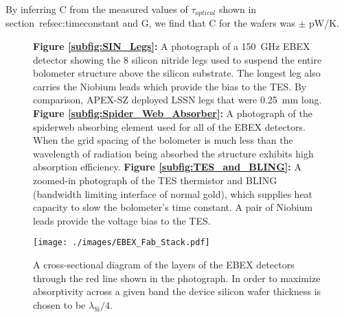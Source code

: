 \documentclass[../EBEXPaper2.tex]{subfiles}
\begin{document}
By inferring C from the measured values of $\tau_{optical}$ shown in section~ref{sec:timeconstant} and G, we find that C for the wafers was   $\pm$  pW/K. 


\begin{figure}[ht!]
\centering
{}
\caption{\textbf{Figure \ref{subfig:SIN_Legs}: } A photograph of a 150~GHz \ac{EBEX} detector showing the 8 silicon nitride legs used to suspend the entire bolometer structure above the silicon substrate.  The longest leg also carries the Niobium leads which provide the bias to the \ac{TES}.  By comparison, APEX-SZ deployed LSSN legs that were 0.25~mm long. \textbf{Figure \ref{subfig:Spider_Web_Absorber}: }  A photograph of the spiderweb absorbing element used for all of the \ac{EBEX} detectors.  When the grid spacing of the bolometer is much less than the wavelength of radiation being absorbed the structure exhibits high absorption efficiency. \textbf{Figure \ref{subfig:TES_and_BLING}: } A zoomed-in photograph of the \ac{TES} thermistor and BLING (bandwidth limiting interface of normal gold), which supplies heat capacity to slow the bolometer's time constant.  A pair of Niobium leads provide the voltage bias to the \ac{TES}.  \label{fig:Bolometer_Overview}}
\end{figure}


\begin{figure}[ht!]
\centering
{\texttt{[image: ./images/EBEX\_Fab\_Stack.pdf]}\label{subfig:Fab_Stack}}
\caption{A cross-sectional diagram of the layers of the \ac{EBEX} detectors through the red line shown in the photograph.  In order to maximize absorptivity across a given band the device silicon wafer thickness is chosen to be $\lambda_\mathrm{Si} /4$.}
\label{fig:EBEX_Fab_Stack}
\end{figure}



%
\end{document}
